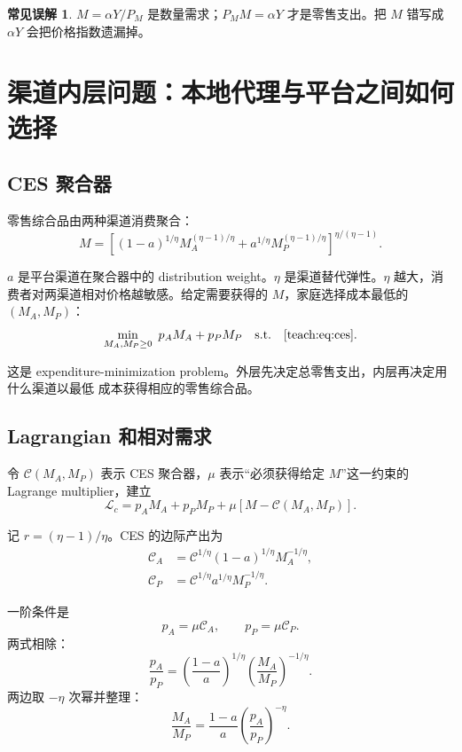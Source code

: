 \documentclass[UTF8,11pt,scheme=chinese,fontset=fandol]{ctexart}
\theoremstyle{definition}
\newtheorem{commonerror}{常见误解}[section]
\begin{document}
\begin{commonerror}
\(M=\alpha Y/P_M\) 是数量需求；\(P_MM=\alpha Y\) 才是零售支出。把 \(M\) 错写成
\(\alpha Y\) 会把价格指数遗漏掉。
\end{commonerror}

\section{渠道内层问题：本地代理与平台之间如何选择}

\subsection{CES 聚合器}

零售综合品由两种渠道消费聚合：
\begin{equation}
M=\left[(1-a)^{1/\eta}M_A^{(\eta-1)/\eta}
+a^{1/\eta}M_P^{(\eta-1)/\eta}\right]^{\eta/(\eta-1)}.
\label{teach:eq:ces}
\end{equation}

\(a\) 是平台渠道在聚合器中的 distribution weight。\(\eta\) 是渠道替代弹性。\(\eta\)
越大，消费者对两渠道相对价格越敏感。给定需要获得的 \(M\)，家庭选择成本最低的
\((M_A,M_P)\)：
\begin{equation}
\min_{M_A,M_P\ge0}\ p_AM_A+p_PM_P
\quad\text{s.t.}\quad \eqref{teach:eq:ces}.
\label{teach:eq:inner-problem}
\end{equation}

这是 expenditure-minimization problem。外层先决定总零售支出，内层再决定用什么渠道以最低
成本获得相应的零售综合品。

\subsection{Lagrangian 和相对需求}

令 \(\mathcal C(M_A,M_P)\) 表示 CES 聚合器，\(\mu\) 表示“必须获得给定 \(M\)”这一约束的
Lagrange multiplier，建立
\[
\mathcal L_c=p_AM_A+p_PM_P+\mu[M-\mathcal C(M_A,M_P)].
\]

记 \(r=(\eta-1)/\eta\)。CES 的边际产出为
\begin{align}
\mathcal C_A
&=\mathcal C^{1/\eta}(1-a)^{1/\eta}M_A^{-1/\eta},\\
\mathcal C_P
&=\mathcal C^{1/\eta}a^{1/\eta}M_P^{-1/\eta}.
\end{align}

一阶条件是
\[
p_A=\mu\mathcal C_A,
\qquad
p_P=\mu\mathcal C_P.
\]
两式相除：
\[
\frac{p_A}{p_P}
=\left(\frac{1-a}{a}\right)^{1/\eta}
\left(\frac{M_A}{M_P}\right)^{-1/\eta}.
\]
两边取 \(-\eta\) 次幂并整理：
\begin{equation}
\frac{M_A}{M_P}
=\frac{1-a}{a}
\left(\frac{p_A}{p_P}\right)^{-\eta}.
\label{teach:eq:relative-demand}
\end{equation}
\end{document}
